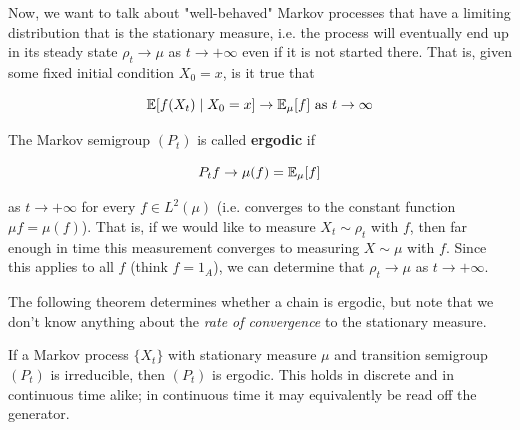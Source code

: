 	Now, we want to talk about "well-behaved" Markov processes that have a limiting distribution that is the stationary measure, i.e. the process will eventually end up in its steady state $\rho_t \rightarrow \mu$ as $t \rightarrow +\infty$ even if it is not started there. That is, given some fixed initial condition $X_0 = x$, is it true that 

		\begin{equation}
			\operatorname{\mathbb{E}}[f(X_t) \mid X_0 = x] \rightarrow \operatorname{\mathbb{E}}_\mu [f] \text{ as } t \rightarrow \infty
		\end{equation}

	\begin{definition}[Ergodicity]
		\label{def:ergodicity}
		The Markov semigroup $(P_t)$ is called \textbf{ergodic} if 

			\begin{equation}
				P_t f \rightarrow \mu(f) = \operatorname{\mathbb{E}}_\mu [f]
			\end{equation}

		as $t \rightarrow +\infty$ for every $f \in L^2 (\mu)$ (i.e. converges to the constant function $\mu f = \mu(f)$). That is, if we would like to measure $X_t \sim \rho_t$ with $f$, then far enough in time this measurement converges to measuring $X \sim \mu$ with $f$. Since this applies to all $f$ (think $f = 1_A$), we can determine that $\rho_t \rightarrow \mu$ as $t \rightarrow +\infty$. 
	\end{definition}

	The following theorem determines whether a chain is ergodic, but note that we don't know anything about the \textit{rate of convergence} to the stationary measure. 

	\begin{theorem}
		\label{thm:uniqueness-of-the-stationary-measure}
		If a Markov process $\{X_t\}$ with stationary measure $\mu$ and transition semigroup $(P_t)$ is irreducible, then $(P_t)$ is ergodic. This holds in discrete and in continuous time alike; in continuous time it may equivalently be read off the generator. 
	\end{theorem}

